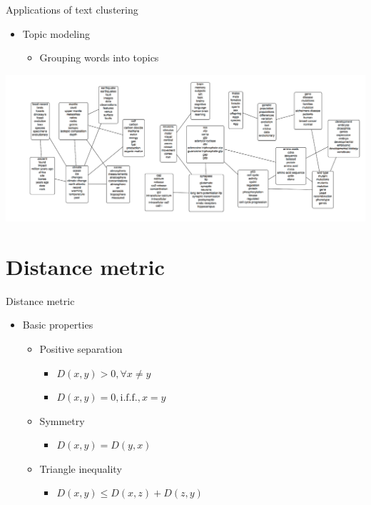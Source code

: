 \documentclass[
  ignorenonframetext,
]{beamer}
\providecommand{\tightlist}{%
  \setlength{\itemsep}{0pt}\setlength{\parskip}{0pt}}
\begin{document}
\begin{frame}{Applications of text clustering}
\protect\hypertarget{applications-of-text-clustering-2}{}
\begin{itemize}
\tightlist
\item
  Topic modeling

  \begin{itemize}
  \tightlist
  \item
    Grouping words into topics
  \end{itemize}
\end{itemize}

\includegraphics[width=1\linewidth]{img/page 9}
\end{frame}

\hypertarget{distance-metric}{%
\section{Distance metric}\label{distance-metric}}

\begin{frame}{Distance metric}
\protect\hypertarget{distance-metric-1}{}
\begin{itemize}
\item
  Basic properties

  \begin{itemize}
  \tightlist
  \item
    Positive separation

    \begin{itemize}
    \tightlist
    \item
      \(𝐷(x,y)>0, \forall x \neq y\)
    \item
      \(𝐷(x,y)=0, \mathrm{i.f.f.}, x=y\)
    \end{itemize}
  \item
    Symmetry

    \begin{itemize}
    \tightlist
    \item
      \(𝐷(x,y)=𝐷(y,x)\)
    \end{itemize}
  \item
    Triangle inequality

    \begin{itemize}
    \tightlist
    \item
      \(𝐷(x,y)≤𝐷(x,z)+𝐷(z,y)\)
    \end{itemize}
  \end{itemize}
\end{itemize}
\end{frame}
\end{document}

